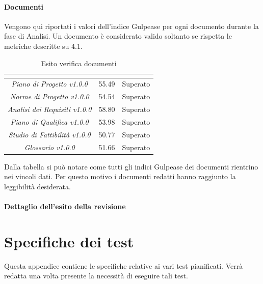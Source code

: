 \paragraph{Documenti} \Spazio
Vengono qui riportati i valori dell'indice Gulpease per ogni documento durante la fase
di Analisi. Un documento è considerato valido soltanto se rispetta le metriche descritte
su 4.1.
\renewcommand{\arraystretch}{1.5}
\begin{table}[H]
\begin{center}
\begin{tabular}{|c|c|c|}
\hline
\rowcolor{title_row}
\textbf{\color{title_text}{Documento}} & \textbf{\color{title_text}{Valore indice}} & \textbf{\color{title_text}{Esito}} \\
\hline
	\emph{Piano di Progetto v1.0.0} & {55.49} & {Superato}\\
\hline
	\emph{Norme di Progetto v1.0.0} & {54.54} & {Superato}\\
\hline
	\emph{Analisi dei Requisiti v1.0.0} & {58.80} & {Superato}\\
\hline
	\emph{Piano di Qualifica v1.0.0} & {53.98} & {Superato}\\
\hline
	\emph{Studio di Fattibilità v1.0.0} & {50.77} & {Superato}\\
\hline
	\emph{Glossario v1.0.0} & {51.66} & {Superato}\\
\hline
\end{tabular}
\caption[Esiti verifica documenti, Analisi]{Esito verifica documenti}
\label{tabella:verifica documenti}
\end{center}
\end{table}
\renewcommand{\arraystretch}{1}

Dalla tabella si può notare come tutti gli indici Gulpease dei documenti rientrino nei vincoli dati. Per questo motivo i documenti redatti hanno raggiunto la leggibilità desiderata.
\paragraph{Dettaglio dell'esito della revisione}


\pagebreak

\section{Specifiche dei test}
Questa appendice contiene le specifiche relative ai vari test pianificati. Verrà redatta una volta presente la necessità di eseguire tali test.
